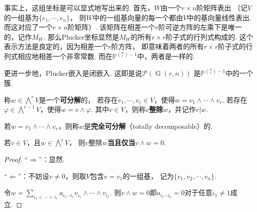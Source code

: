     \begin{remark}
        事实上，这组坐标是可以显式地写出来的. 
        首先，$W$由一个$r \times n$阶矩阵表出
        （记$V$的一组基为$\{e_{1},\cdots,e_{n}\}$，
        则$W$中的一组基向量的每一个都由$V$中的基向量线性表出. 
        而这对应了一个$r \times n$阶矩阵）.
        该矩阵在相差一个$r$阶可逆方阵的左乘下是唯一的，记作$M_{W}$. 
        那么Plucker坐标显然是$M_{W}$的所有$r \times r$阶子式的行列式构成的.
        这个表示方法是良定的，因为相差一个$r$阶方阵，
        即意味着两者的所有$r \times r$阶子式的行列式相应地相差一个非零常数. 
        而在$\mathbb{P}^{{n \choose r}-1}$中，两者是一样的.
    \end{remark}

    更进一步地，Plucker嵌入是闭嵌入. 
    这即是说$\mathcal{P}(\operatorname{G}(r,n))$
    是$\mathbb{P}^{{n \choose r}-1}$中的一个簇.

    \begin{definition}
        称$w \in \bigwedge\nolimits^{r} V$是一个\textbf{可分解}的，
        若存在$v_{1},\cdots,v_{r} \in V$，使得$w=v_{1} \wedge \cdots \wedge v_{r}$.
        若存在$\varphi \in \bigwedge\nolimits^{r-1} V$，使得$w=v \wedge \varphi$.
        其中$v \in V$，则称\textbf{$v$整除$w$}，并记作$v | w$.

        若$w = v_{1} \wedge \cdots \wedge v_{r}$，则称$w$是\textbf{完全可分解}（totally decomposable）的.
    \end{definition}

    \begin{lemma}
        若$v \in V$，且$w \in \bigwedge\nolimits^{r} V$，
        则$v$整除$w$\textbf{当且仅当}$v \wedge w = 0$.
    \end{lemma}
    \begin{proof}
        “$\Rightarrow$”：显然. \par
        “$\Leftarrow$”：不妨设$v \neq 0$，则取$V$包含$v=v_{1}$的一组基，
        记为$\{v_{1},v_{2},\cdots,v_{n}\}$. \par
        令$w=\sum_{i_{1}<\cdots<i_{r}}a_{i_{1}\cdots i_{r}}v_{i_{1}}\wedge\cdots\wedge v_{i_{r}}$.
        则$v \wedge w=0$即$a_{i_{1}\cdots i_{r}}=0$对于任意$i_{1}\neq 1$成立.
    \end{proof}

